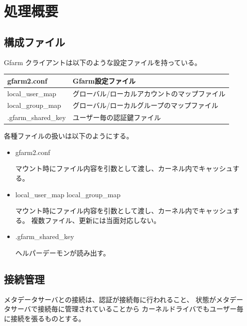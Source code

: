 \section{処理概要}
\subsection{構成ファイル}

Gfarm クライアントは以下のような設定ファイルを持っている。

\begin{tabular}{|p{3cm}|p{10cm}|}\hline
gfarm2.conf	& Gfarm設定ファイル	\\\hline
local_user_map	& グローバル/ローカルアカウントのマップファイル	\\\hline
local_group_map	& グローバル/ローカルグループのマップファイル	\\\hline
.gfarm_shared_key	& ユーザー毎の認証鍵ファイル	\\\hline
\end{tabular}
\medskip

各種ファイルの扱いは以下のようにする。
\begin{itemize}
\item	gfarm2.conf	\par
	マウント時にファイル内容を引数として渡し、カーネル内でキャッシュする。
\item	local_user_map	local_group_map	\par
	マウント時にファイル内容を引数として渡し、カーネル内でキャッシュする。
	複数ファイル、更新には当面対応しない。
\item	.gfarm_shared_key	\par
	ヘルパーデーモンが読み出す。
\end{itemize}


\subsection{接続管理}
	メタデータサーバとの接続は、認証が接続毎に行われること、
	状態がメタデータサーバで接続毎に管理されていることから
	カーネルドライバでもユーザー毎に接続を張るものとする。

